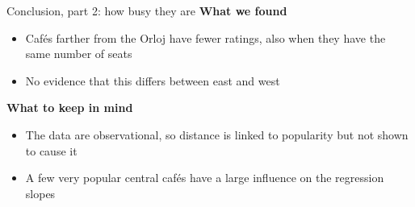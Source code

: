 \documentclass[aspectratio=169,10pt]{beamer}
\newcommand{\tab}[1]{../report/tables/#1}
\begin{document}
\begin{frame}{Conclusion, part 2: how busy they are}
\textbf{What we found}
\begin{itemize}
  \item Caf\'es farther from the Orloj have fewer ratings, also when they have the same number of seats
  \item No evidence that this differs between east and west
\end{itemize}
\textbf{What to keep in mind}
\begin{itemize}
  \item The data are observational, so distance is linked to popularity but not shown to cause it
  \item A few very popular central caf\'es have a large influence on the regression slopes
\end{itemize}
\end{frame}

\begin{frame}{Backup: all ten results}
\centering
\resizebox{\textwidth}{!}{}}

\medskip
{\footnotesize CI is the 95\% confidence interval, two-sided also for the one-tailed tests. pp = percentage points.}
\end{frame}
\end{document}
